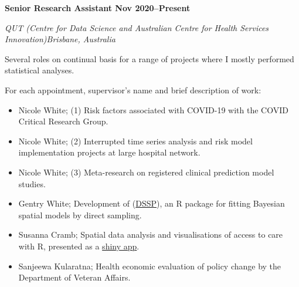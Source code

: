
\textbf{Senior Research Assistant \hfill Nov 2020--Present}\par
\textit{QUT (Centre for Data Science and Australian Centre for Health Services Innovation)\hfill Brisbane, Australia}\par
Several roles on continual basis for a range of projects where I mostly performed statistical analyses.\par
For each appointment, supervisor's name and brief description of work:\par
\begin{itemize}
	\item Nicole White; (1) Risk factors associated with COVID-19 with the COVID Critical Research Group.
	\item Nicole White; (2) Interrupted time series analysis and risk model implementation projects at large hospital network.
	\item Nicole White; (3) Meta-research on registered clinical prediction model studies.
    \item Gentry White; Development of (\href{https://cran.r-project.org/web/packages/DSSP/index.html}{DSSP}), an R package for fitting Bayesian spatial models by direct sampling.
	\item Susanna Cramb; Spatial data analysis and visualisations of access to care with R, presented as a \href{https://github.com/RWParsons/iTRAQI_app/}{shiny app}.
	\item Sanjeewa Kularatna; Health economic evaluation of policy change by the Department of Veteran Affairs.
\end{itemize}\par